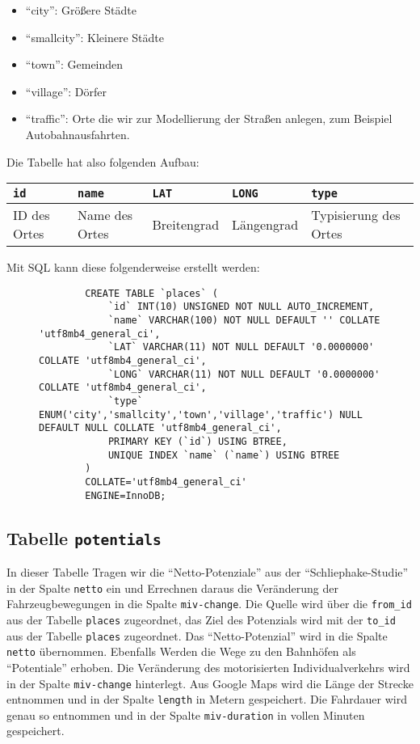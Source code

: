 \documentclass[fontsize=12pt,a4paper]{scrreprt}
\begin{document}
\begin{itemize}
    \item \enquote{city}: Größere Städte
    \item \enquote{smallcity}: Kleinere Städte
    \item \enquote{town}: Gemeinden
    \item \enquote{village}: Dörfer
    \item \enquote{traffic}: Orte die wir zur Modellierung der Straßen anlegen, zum Beispiel Autobahnausfahrten.
\end{itemize}

Die Tabelle hat also folgenden Aufbau:

\begin{table}[htbp]
    \begin{tabular}{|l|l|l|l|l|}\hline
        \texttt{id} & \texttt{name} & \texttt{LAT} & \texttt{LONG} & \texttt{type}\\\hline
        ID des Ortes & Name des Ortes & Breitengrad & Längengrad & Typisierung des Ortes \\ \hline
    \end{tabular}
\end{table}

Mit SQL kann diese folgenderweise erstellt werden:
\begin{figure}[htbp]
    \begin{verbatim}
        CREATE TABLE `places` (
            `id` INT(10) UNSIGNED NOT NULL AUTO_INCREMENT,
            `name` VARCHAR(100) NOT NULL DEFAULT '' COLLATE 'utf8mb4_general_ci',
            `LAT` VARCHAR(11) NOT NULL DEFAULT '0.0000000' COLLATE 'utf8mb4_general_ci',
            `LONG` VARCHAR(11) NOT NULL DEFAULT '0.0000000' COLLATE 'utf8mb4_general_ci',
            `type` ENUM('city','smallcity','town','village','traffic') NULL DEFAULT NULL COLLATE 'utf8mb4_general_ci',
            PRIMARY KEY (`id`) USING BTREE,
            UNIQUE INDEX `name` (`name`) USING BTREE
        )
        COLLATE='utf8mb4_general_ci'
        ENGINE=InnoDB;
    \end{verbatim}
\end{figure}

\subsection{Tabelle \texttt{potentials}}

In dieser Tabelle Tragen wir die \enquote{Netto-Potenziale} aus der \enquote{Schliephake-Studie} in der Spalte \texttt{netto} ein und Errechnen daraus die Veränderung der Fahrzeugbewegungen in die Spalte \texttt{miv-change}. Die Quelle wird über die \texttt{from_id} aus der Tabelle \texttt{places} zugeordnet, das Ziel des Potenzials wird mit der \texttt{to_id} aus der Tabelle \texttt{places} zugeordnet. Das \enquote{Netto-Potenzial} wird in die Spalte \texttt{netto} übernommen. Ebenfalls Werden die Wege zu den Bahnhöfen als \enquote{Potentiale} erhoben. Die Veränderung des motorisierten Individualverkehrs wird in der Spalte \texttt{miv-change} hinterlegt. Aus Google Maps wird die Länge der Strecke entnommen und in der Spalte \texttt{length} in Metern gespeichert. Die Fahrdauer wird genau so entnommen und in der Spalte \texttt{miv-duration} in vollen Minuten gespeichert.
\end{document}

